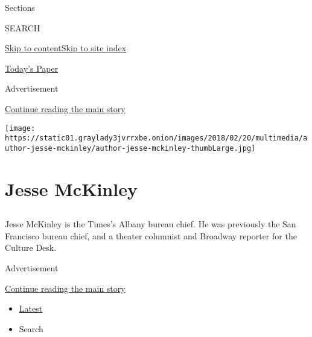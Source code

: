 Sections

SEARCH

\protect\hyperlink{site-content}{Skip to
content}\protect\hyperlink{site-index}{Skip to site index}

\href{https://myaccount.nytimes3xbfgragh.onion/auth/login?response_type=cookie\&client_id=vi}{}

\href{https://www.nytimes3xbfgragh.onion/section/todayspaper}{Today's
Paper}

Advertisement

\protect\hyperlink{after-top}{Continue reading the main story}

\texttt{[image: https://static01.graylady3jvrrxbe.onion/images/2018/02/20/multimedia/author-jesse-mckinley/author-jesse-mckinley-thumbLarge.jpg]}

\hypertarget{jesse-mckinley}{%
\section{Jesse McKinley}\label{jesse-mckinley}}

\subsection{}

Jesse McKinley is the Times's Albany bureau chief. He was previously the
San Francisco bureau chief, and a theater columnist and Broadway
reporter for the Culture Desk.

Advertisement

\protect\hyperlink{after-mid1}{Continue reading the main story}

\begin{itemize}
\tightlist
\item
  \protect\hyperlink{stream-panel}{Latest}
\item
  Search
\end{itemize}

